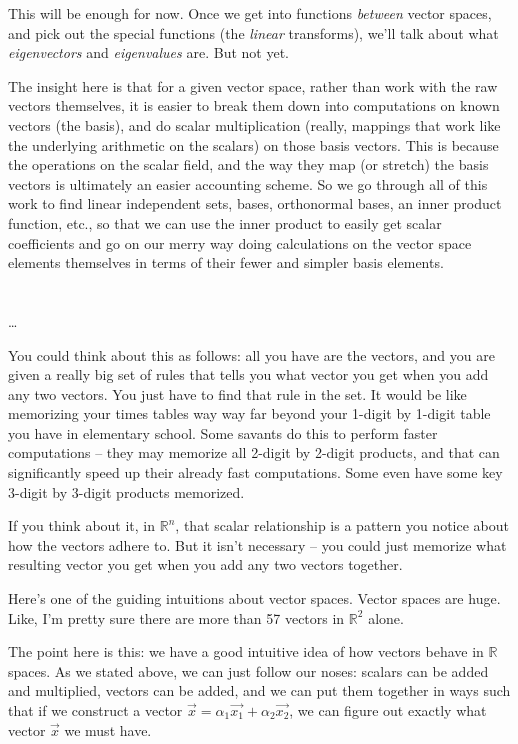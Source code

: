 \documentclass[
]{book}
\begin{document}
This will be enough for now. Once we get into functions \emph{between} vector spaces, and pick out the special functions (the \emph{linear} transforms), we'll talk about what \emph{eigenvectors} and \emph{eigenvalues} are. But not yet.

The insight here is that for a given vector space, rather than work with the raw vectors themselves, it is easier to break them down into computations on known vectors (the basis), and do scalar multiplication (really, mappings that work like the underlying arithmetic on the scalars) on those basis vectors. This is because the operations on the scalar field, and the way they map (or stretch) the basis vectors is ultimately an easier accounting scheme. So we go through all of this work to find linear independent sets, bases, orthonormal bases, an inner product function, etc., so that we can use the inner product to easily get scalar coefficients and go on our merry way doing calculations on the vector space elements themselves in terms of their fewer and simpler basis elements.

\hypertarget{section}{%
\section{}\label{section}}

\ldots{}

You could think about this as follows: all you have are the vectors, and you are given a really big set of rules that tells you what vector you get when you add any two vectors. You just have to find that rule in the set. It would be like memorizing your times tables way way far beyond your 1-digit by 1-digit table you have in elementary school. Some savants do this to perform faster computations -- they may memorize all 2-digit by 2-digit products, and that can significantly speed up their already fast computations. Some even have some key 3-digit by 3-digit products memorized.

If you think about it, in \(\mathbb{R}^n\), that scalar relationship is a pattern you notice about how the vectors adhere to. But it isn't necessary -- you could just memorize what resulting vector you get when you add any two vectors together.

Here's one of the guiding intuitions about vector spaces. Vector spaces are huge. Like, I'm pretty sure there are more than 57 vectors in \(\mathbb{R}^2\) alone.

The point here is this: we have a good intuitive idea of how vectors behave in \(\mathbb{R}\) spaces. As we stated above, we can just follow our noses: scalars can be added and multiplied, vectors can be added, and we can put them together in ways such that if we construct a vector \(\vec{x} = \alpha_{1} \vec{x_{1}} + \alpha_{2} \vec{x_{2}}\), we can figure out exactly what vector \(\vec{x}\) we must have.
\end{document}
